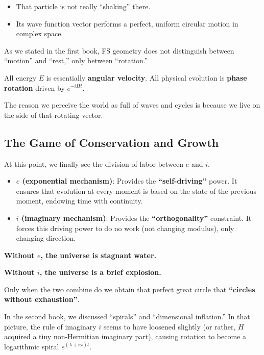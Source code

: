 \documentclass[11pt,a4paper,twoside]{book}
\begin{document}
\begin{itemize}
\item That particle is not really ``shaking'' there.

\item Its wave function vector performs a perfect, uniform circular motion in complex space.
\end{itemize}

As we stated in the first book, FS geometry does not distinguish between ``motion'' and ``rest,'' only between ``rotation.''

All energy $E$ is essentially \textbf{angular velocity}. All physical evolution is \textbf{phase rotation} driven by $e^{-iHt}$.

The reason we perceive the world as full of waves and cycles is because we live on the side of that rotating vector.

\subsection{The Game of Conservation and Growth}

At this point, we finally see the division of labor between \textbf{$e$} and \textbf{$i$}.

\begin{itemize}
\item \textbf{$e$ (exponential mechanism)}: Provides the \textbf{``self-driving''} power. It ensures that evolution at every moment is based on the state of the previous moment, endowing time with continuity.

\item \textbf{$i$ (imaginary mechanism)}: Provides the \textbf{``orthogonality''} constraint. It forces this driving power to do no work (not changing modulus), only changing direction.
\end{itemize}

\textbf{Without $e$, the universe is stagnant water.}

\textbf{Without $i$, the universe is a brief explosion.}

Only when the two combine do we obtain that perfect great circle that \textbf{``circles without exhaustion''}.

In the second book, we discussed ``spirals'' and ``dimensional inflation.'' In that picture, the rule of imaginary $i$ seems to have loosened slightly (or rather, $H$ acquired a tiny non-Hermitian imaginary part), causing rotation to become a logarithmic spiral $e^{(\lambda+i\omega)t}$.
\end{document}
